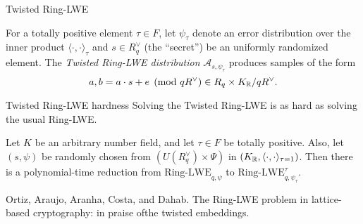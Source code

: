 \documentclass[notheorems, bigger]{beamer}
\begin{document}
\begin{frame}[label={sec:orgd70cd8d}]{Twisted Ring-LWE}
\begin{text}
  For a totally positive element $\tau \in F$, let $\psi_\tau$ denote an error distribution
  over the inner product $\langle{\cdot,\cdot}\rangle_\tau$ and $s \in R^\vee_q$ (the “secret”) be an
  uniformly randomized element. The \emph{Twisted Ring-LWE distribution}
  $\mathcal{A}_{s,\psi_\tau}$ produces samples of the form
  \[
    a, b = a \cdot s + e \pmod{qR^\vee} \in R_q \times K_{\mathbb{R}}/qR^\vee.
\]
\end{text}
\end{frame}
\begin{frame}[label={sec:org08e67de}]{Twisted Ring-LWE hardness}
Solving the Twisted Ring-LWE is as hard as solving the usual Ring-LWE.
\begin{text}

  \begin{theorem}
    Let $K$ be an arbitrary number field, and let $\tau \in F$ be totally positive.
    Also, let $(s,\psi)$ be randomly chosen from $(U(R_q^\vee)\times \Psi)$ in $(K_{\mathbb{R}},\langle{\cdot,\cdot}\rangle_{\tau=1})$.
    Then there is a polynomial-time reduction from $\mbox{Ring-LWE}_{q,\psi}$ to $\mbox{Ring-LWE}^\tau_{q,\psi_\tau}$.
  \end{theorem}

  \tiny Ortiz, Araujo, Aranha, Costa, and Dahab. The Ring-LWE problem in lattice-based cryptography: in praise ofthe twisted embeddings.
\end{text}
\end{frame}
\end{document}
